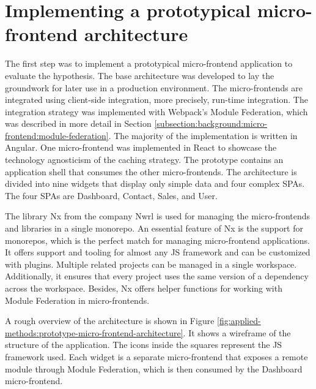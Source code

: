 \section{Implementing a prototypical micro-frontend architecture}\label{section:applied-methods:prototypical-implementation}

The first step was to implement a prototypical micro-frontend application to evaluate the hypothesis. The base architecture was developed to lay the groundwork for later use in a production environment. The micro-frontends are integrated using client-side integration, more precisely, run-time integration. The integration strategy was implemented with Webpack's Module Federation, which was described in more detail in Section \ref{subsection:background:micro-frontend:module-federation}. The majority of the implementation is written in Angular. One micro-frontend was implemented in React to showcase the technology agnosticism of the caching strategy. The prototype contains an application shell that consumes the other micro-frontends. The architecture is divided into nine widgets that display only simple data and four complex 
\acp{SPA}. The four \acp{SPA} are Dashboard, Contact, Sales, and User.

\bigskip

\noindent The library Nx from the company Nwrl is used for managing the micro-frontends and libraries in a single monorepo. An essential feature of Nx is the support for monorepos, which is the perfect match for managing micro-frontend applications. It offers support and tooling for almost any \ac{JS} framework and can be customized with plugins. Multiple related projects can be managed in a single workspace. Additionally, it ensures that every project uses the same version of a dependency across the workspace. Besides, Nx offers helper functions for working with Module Federation in micro-frontends. \cite{misc:-:applied-methods:intro-to-nx}

\bigskip

\noindent A rough overview of the architecture is shown in Figure \ref{fig:applied-methods:prototype-micro-frontend-architecture}. It shows a wireframe of the structure of the application. The icons inside the squares represent the \ac{JS} framework used. Each widget is a separate micro-frontend that exposes a remote module through Module Federation, which is then consumed by the Dashboard micro-frontend.

